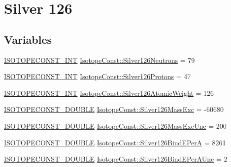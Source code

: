 \hypertarget{group___isotope_const-_silver-_ag126}{}\section{Silver 126}
\label{group___isotope_const-_silver-_ag126}
\subsection*{Variables}
\begin{DoxyCompactItemize}
\item 
\mbox{\hyperlink{group___isotope_const-_macros_ga5f18360b3e99483a35c32d789e62621c}{I\+S\+O\+T\+O\+P\+E\+C\+O\+N\+S\+T\+\_\+\+I\+NT}} \mbox{\hyperlink{group___isotope_const-_silver-_ag126_ga99d3ab5c6c75d5df6bb41897aebc64e8}{Isotope\+Const\+::\+Silver126\+Neutrons}} = 79
\item 
\mbox{\hyperlink{group___isotope_const-_macros_ga5f18360b3e99483a35c32d789e62621c}{I\+S\+O\+T\+O\+P\+E\+C\+O\+N\+S\+T\+\_\+\+I\+NT}} \mbox{\hyperlink{group___isotope_const-_silver-_ag126_gacfd6af47296971c52b9164ee5d118f49}{Isotope\+Const\+::\+Silver126\+Protons}} = 47
\item 
\mbox{\hyperlink{group___isotope_const-_macros_ga5f18360b3e99483a35c32d789e62621c}{I\+S\+O\+T\+O\+P\+E\+C\+O\+N\+S\+T\+\_\+\+I\+NT}} \mbox{\hyperlink{group___isotope_const-_silver-_ag126_gaf2a9b399feea5bf132cbfa2cbbf2caf3}{Isotope\+Const\+::\+Silver126\+Atomic\+Weight}} = 126
\item 
\mbox{\hyperlink{group___isotope_const-_macros_ga8f45a7272ce02c0b4c65c44636ed719a}{I\+S\+O\+T\+O\+P\+E\+C\+O\+N\+S\+T\+\_\+\+D\+O\+U\+B\+LE}} \mbox{\hyperlink{group___isotope_const-_silver-_ag126_ga5fac1ac580d66851b2257121fa915e17}{Isotope\+Const\+::\+Silver126\+Mass\+Exc}} = -\/60680
\item 
\mbox{\hyperlink{group___isotope_const-_macros_ga8f45a7272ce02c0b4c65c44636ed719a}{I\+S\+O\+T\+O\+P\+E\+C\+O\+N\+S\+T\+\_\+\+D\+O\+U\+B\+LE}} \mbox{\hyperlink{group___isotope_const-_silver-_ag126_gac24dca72bea3dcce009e1af08c43dea7}{Isotope\+Const\+::\+Silver126\+Mass\+Exc\+Unc}} = 200
\item 
\mbox{\hyperlink{group___isotope_const-_macros_ga8f45a7272ce02c0b4c65c44636ed719a}{I\+S\+O\+T\+O\+P\+E\+C\+O\+N\+S\+T\+\_\+\+D\+O\+U\+B\+LE}} \mbox{\hyperlink{group___isotope_const-_silver-_ag126_ga40c90cae02a9ab7bb0dbcedce317a818}{Isotope\+Const\+::\+Silver126\+Bind\+E\+PerA}} = 8261
\item 
\mbox{\hyperlink{group___isotope_const-_macros_ga8f45a7272ce02c0b4c65c44636ed719a}{I\+S\+O\+T\+O\+P\+E\+C\+O\+N\+S\+T\+\_\+\+D\+O\+U\+B\+LE}} \mbox{\hyperlink{group___isotope_const-_silver-_ag126_ga49aac119019ee394abac26fd953797ec}{Isotope\+Const\+::\+Silver126\+Bind\+E\+Per\+A\+Unc}} = 2

\end{DoxyCompactItemize}
